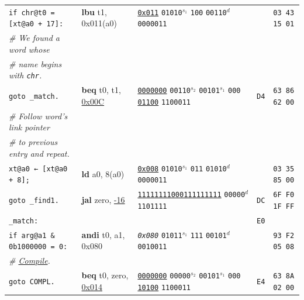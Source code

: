 \documentclass[a4paper,12pt,final]{article}
\begin{document}
\begin{table}[!htbp]
\begin{adjustwidth}{-1cm}{-1cm}
\begin{center}
\begin{tabular}{l|ll|l|l}
\hspace{1em} \texttt{if chr@t0 = [xt@a0 + 17]:} & \textbf{lbu} t1, 0x011(a0) & \uline{\texttt{0x011}}                    \texttt{01010}​\(^{s_{1}}\) \texttt{100} \texttt{00110}​\(^{d}\)  \texttt{0000011} &  & \texttt{03 43 15 01}\\[0pt]
\hspace{2em}     \emph{\# We found a word whose} &  &  &  & \\[0pt]
\hspace{2em}     \emph{\# name begins with \texttt{chr}.} &  &  &  & \\[0pt]
\hspace{2em}     \texttt{goto \_match.} & \textbf{beq} t0, t1, \uline{0x00C} & \uline{\texttt{0000000}} \texttt{00110}​\(^{s_{2}}\) \texttt{00101}​\(^{s_{1}}\) \texttt{000} \uline{\texttt{01100}} \texttt{1100011} & \texttt{D4} & \texttt{63 86 62 00}\\[0pt]
\hspace{1em} \emph{\# Follow word's link pointer} &  &  &  & \\[0pt]
\hspace{1em} \emph{\# to previous entry and repeat.} &  &  &  & \\[0pt]
\hspace{1em} \texttt{xt@a0 ← [xt@a0 + 8];} & \textbf{ld} a0, 8(a0) & \uline{\texttt{0x008}}                    \texttt{01010}​\(^{s_{1}}\) \texttt{011} \texttt{01010}​\(^{d}\)  \texttt{0000011} &  & \texttt{03 35 85 00}\\[0pt]
\hspace{1em} \texttt{goto \_find1.} & \textbf{jal} zero, \uline{-16} & \uline{\texttt{11111111000111111111}}                                     \texttt{00000}​\(^{d}\)  \texttt{1101111} & \texttt{DC} & \texttt{6F F0 1F FF}\\[0pt]
\texttt{\_match:} &  &  & \texttt{E0} & \\[0pt]
\hspace{1em} \texttt{if arg@a1 \& 0b1000000 = 0:} & \textbf{andi} t0, a1, 0x080 & \emph{\texttt{0x080}}                    \texttt{01011}​\(^{s_{1}}\) \texttt{111} \texttt{00101}​\(^{d}\)  \texttt{0010011} &  & \texttt{93 F2 05 08}\\[0pt]
\hspace{2em}     \emph{\# \uline{Compile}.} &  &  &  & \\[0pt]
\hspace{2em}     \texttt{goto COMPL.} & \textbf{beq} t0, zero, \uline{0x014} & \uline{\texttt{0000000}} \texttt{00000}​\(^{s_{2}}\) \texttt{00101}​\(^{s_{1}}\) \texttt{000} \uline{\texttt{10100}} \texttt{1100011} & \texttt{E4} & \texttt{63 8A 02 00}\\[0pt]

\end{tabular}
\end{center}
\end{adjustwidth}
\end{table}
\end{document}
